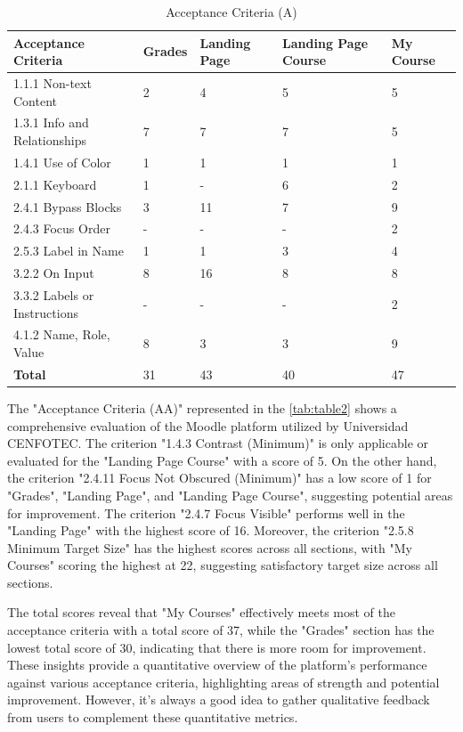 \documentclass{IEEEtran}
\begin{document}
\vspace{2cm}
\begin{table}[h]
    \centering
    \caption{Acceptance Criteria (A)}
    \label{tab:table1}
    \begin{tabularx}{\columnwidth}{|l|X|X|X|X|}
    \hline
    \textbf{Acceptance Criteria} & \textbf{Grades} & \textbf{Landing Page} & \textbf{Landing Page Course} & \textbf{My Course} \\ 
    \hline
    1.1.1 Non-text Content & 2 & 4 & 5 & 5 \\ 
    \hline
    1.3.1 Info and Relationships & 7 & 7 & 7 & 5 \\
    \hline
    1.4.1 Use of Color & 1 & 1 & 1 & 1 \\
    \hline
    2.1.1 Keyboard & 1 & - & 6 & 2 \\
    \hline
    2.4.1 Bypass Blocks & 3 & 11 & 7 & 9 \\
    \hline
    2.4.3 Focus Order & - & - & - & 2 \\
    \hline
    2.5.3 Label in Name & 1 & 1 & 3 & 4 \\
    \hline
    3.2.2 On Input & 8 & 16 & 8 & 8 \\
    \hline
    3.3.2 Labels or Instructions & - & - & - & 2 \\
    \hline
    4.1.2 Name, Role, Value & 8 & 3 & 3 & 9 \\
    \hline
    \textbf{Total} & 31 & 43 & 40 & 47 \\
    \hline
    \end{tabularx}
\end{table}

\vspace{1cm}

The "Acceptance Criteria (AA)" represented in the \ref{tab:table2} shows a comprehensive evaluation of the Moodle platform utilized by Universidad CENFOTEC. The criterion "1.4.3 Contrast (Minimum)" is only applicable or evaluated for the "Landing Page Course" with a score of 5. On the other hand, the criterion "2.4.11 Focus Not Obscured (Minimum)" has a low score of 1 for "Grades", "Landing Page", and "Landing Page Course", suggesting potential areas for improvement. The criterion "2.4.7 Focus Visible" performs well in the "Landing Page" with the highest score of 16. Moreover, the criterion "2.5.8 Minimum Target Size" has the highest scores across all sections, with "My Courses" scoring the highest at 22, suggesting satisfactory target size across all sections.

The total scores reveal that "My Courses" effectively meets most of the acceptance criteria with a total score of 37, while the "Grades" section has the lowest total score of 30, indicating that there is more room for improvement. These insights provide a quantitative overview of the platform's performance against various acceptance criteria, highlighting areas of strength and potential improvement. However, it's always a good idea to gather qualitative feedback from users to complement these quantitative metrics.
\end{document}
